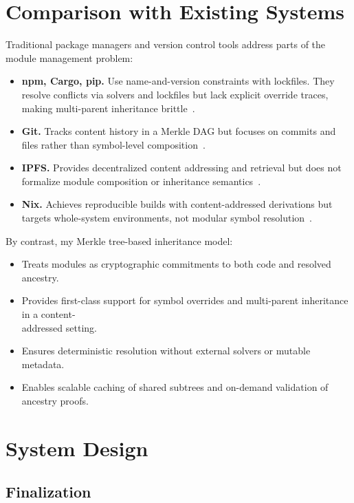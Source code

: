 \documentclass[sigplan,screen]{acmart}
\begin{document}
\section{Comparison with Existing Systems}
\label{sec:comparison}

Traditional package managers and version control tools address parts of the module management problem:

\begin{itemize}
	\item \textbf{npm, Cargo, pip.} Use name-and-version constraints with lockfiles. They resolve conflicts via solvers and lockfiles but lack explicit override traces, making multi-parent inheritance brittle~\cite{npm_docs, cargo_docs, pip_docs}.
	\item \textbf{Git.} Tracks content history in a Merkle DAG but focuses on commits and files rather than symbol-level composition~\cite{git}.
	\item \textbf{IPFS.} Provides decentralized content addressing and retrieval but does not formalize module composition or inheritance semantics~\cite{benet2014}.
	\item \textbf{Nix.} Achieves reproducible builds with content-addressed derivations but targets whole-system environments, not modular symbol resolution~\cite{nix_docs}.
\end{itemize}

By contrast, my Merkle tree-based inheritance model:

\begin{itemize}
	\item Treats modules as cryptographic commitments to both code and resolved ancestry.
	\item Provides first-class support for symbol overrides and multi-parent inheritance in a content-\\addressed setting.
	\item Ensures deterministic resolution without external solvers or mutable metadata.
	\item Enables scalable caching of shared subtrees and on-demand validation of ancestry proofs.
\end{itemize}

\section{System Design}
\label{sec:system-design}

\subsection{Finalization}
\label{sec:finalization}
\end{document}
